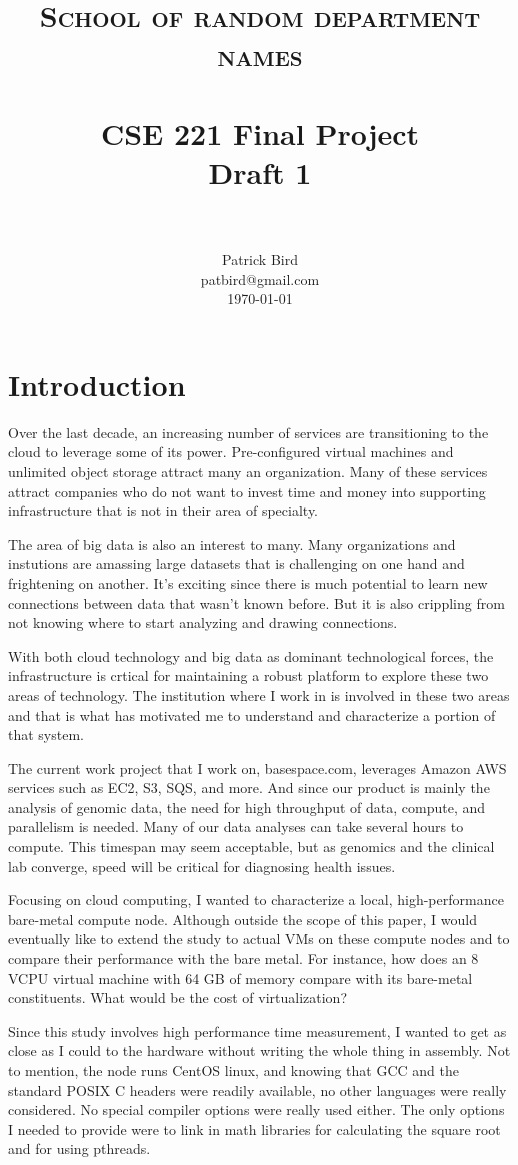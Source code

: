 \documentclass[paper=a4, fontsize=11pt]{scrartcl}
\title{
        \usefont{OT1}{bch}{b}{n}
        \normalfont \normalsize \textsc{School of random department names} \\ [25pt]
        \horrule{0.5pt} \\[0.4cm]
        \huge CSE 221 Final Project \\
        \huge       Draft 1         \\
        \horrule{2pt} \\[0.5cm]
}
\author{
        \normalfont                                 \normalsize
        Patrick Bird\\[-3pt]        \normalsize
        patbird@gmail.com\\           \normalsize
        \today
}
\date{}
\numberwithin{equation}{section}        %
\numberwithin{figure}{section}          %
\numberwithin{table}{section}               %
\begin{document}
\maketitle
\section{Introduction}
Over the last decade, an increasing number of services are transitioning to the cloud to leverage some of its power.  Pre-configured virtual machines and unlimited object storage attract many an organization.  Many of these services attract companies who do not want to invest time and money into supporting infrastructure that is not in their area of specialty.

The area of big data is also an interest to many.  Many organizations and instutions are amassing large datasets that is challenging on one hand and frightening on another.  It's exciting since there is much potential to learn new connections between data that wasn't known before.  But it is also crippling from not knowing where to start analyzing and drawing connections.

With both cloud technology and big data as dominant technological forces, the infrastructure is crtical for maintaining a robust platform to explore these two areas of technology.  The institution where I work in is involved in these two areas and that is what has motivated me to understand and characterize a portion of that system.

The current work project that I work on, basespace.com, leverages Amazon AWS services such as EC2, S3, SQS, and more.  And since our product is mainly the analysis of genomic data, the need for high throughput of data, compute, and parallelism is needed.  Many of our data analyses can take several hours to compute.  This timespan may seem acceptable, but as genomics and the clinical lab converge, speed will be critical for diagnosing health issues.

Focusing on cloud computing, I wanted to characterize a local, high-performance bare-metal compute node.  Although outside the scope of this paper, I would eventually like to extend the study to actual VMs on these compute nodes and to compare their performance with the bare metal.  For instance, how does an 8 VCPU virtual machine with 64 GB of memory compare with its bare-metal constituents.  What would be the cost of virtualization?

Since this study involves high performance time measurement, I wanted to get as close as I could to the hardware without writing the whole thing in assembly.  Not to mention, the node runs CentOS linux, and knowing that GCC and the standard POSIX C headers were readily available, no other languages were really considered.  No special compiler options were really used either.  The only options I needed to provide were to link in math libraries for calculating the square root and for using pthreads.
\end{document}
